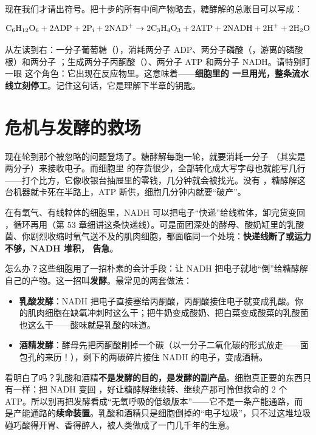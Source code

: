 现在我们才请出符号。把十步的所有中间产物略去，糖酵解的总账目可以写成：

\[\mathrm{C_6H_{12}O_6} + \mathrm{2ADP} + \mathrm{2P_{i}} + \mathrm{2NAD^{+}} \rightarrow \mathrm{2C_3H_4O_3} + \mathrm{2ATP} + \mathrm{2NADH} + \mathrm{2H^{+}} + \mathrm{2H_2O}\]

从左读到右：一分子葡萄糖（），消耗两分子 ADP、两分子磷酸（，游离的磷酸根）和两分子 ；生成两分子丙酮酸（）、两分子 ATP 和两分子 NADH。请特别盯一眼  这个角色：它出现在反应物里。这意味着——\textbf{细胞里的  一旦用光，整条流水线立刻停工}。记住这句话，它是理解下半章的钥匙。

\section{ 危机与发酵的救场}

现在轮到那个被忽略的问题登场了。糖酵解每跑一轮，就要消耗一分子 （其实是两分子）来接收电子。而细胞里  的存货很少，全部转化成大写字母也就能写几行——打个比方，它像收银台抽屉里的零钱，几分钟就会被找光。没有 ，糖酵解这台机器就卡死在半路上，ATP 断供，细胞几分钟内就要“破产”。

在有氧气、有线粒体的细胞里，NADH 可以把电子“快递”给线粒体，卸完货变回 ，循环再用（第 53 章细讲这条快递线）。可是面团深处的酵母、酸奶缸里的乳酸菌、你剧烈收缩时氧气送不及的肌肉细胞，都面临同一个处境：\textbf{快递线断了或运力不够，NADH 堆积， 告急}。

怎么办？这些细胞用了一招朴素的会计手段：让 NADH 把电子就地“倒”给糖酵解自己的产物。这一招叫\textbf{发酵}。最常见的两套做法：

\begin{itemize}[itemsep=2pt]
\item \textbf{乳酸发酵}：NADH 把电子直接塞给丙酮酸，丙酮酸接住电子就变成乳酸。你的肌肉细胞在缺氧冲刺时这么干；把牛奶变成酸奶、把白菜变成酸菜的乳酸菌也这么干——酸味就是乳酸的味道。
\item \textbf{酒精发酵}：酵母先把丙酮酸削掉一个碳（以一分子二氧化碳的形式放走——面包孔的来历！），剩下的两碳碎片接住 NADH 的电子，变成酒精。
\end{itemize}

看明白了吗？乳酸和酒精\textbf{不是发酵的目的，是发酵的副产品}。细胞真正要的东西只有一样：把 NADH 变回 ，好让糖酵解继续转、继续产那可怜但救命的 2 个 ATP。所以别再把发酵看成“无氧呼吸的低级版本”——它不是一条产能通路，而是产能通路的\textbf{续命装置}。乳酸和酒精只是细胞倒掉的“电子垃圾”，只不过这堆垃圾碰巧酸得开胃、香得醉人，被人类做成了一门几千年的生意。

